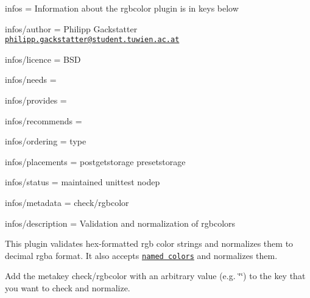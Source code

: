 
\begin{DoxyItemize}
\item infos = Information about the rgbcolor plugin is in keys below
\item infos/author = Philipp Gackstatter \href{mailto:philipp.gackstatter@student.tuwien.ac.at}{\tt philipp.\+gackstatter@student.\+tuwien.\+ac.\+at}
\item infos/licence = B\+SD
\item infos/needs =
\item infos/provides =
\item infos/recommends =
\item infos/ordering = type
\item infos/placements = postgetstorage presetstorage
\item infos/status = maintained unittest nodep
\item infos/metadata = check/rgbcolor
\item infos/description = Validation and normalization of rgbcolors
\end{DoxyItemize}

This plugin validates hex-\/formatted rgb color strings and normalizes them to decimal rgba format. It also accepts \href{https://www.w3.org/TR/css-color-3/#svg-color}{\tt named colors} and normalizes them.

Add the metakey {\ttfamily check/rgbcolor} with an arbitrary value (e.\+g. {\ttfamily \char`\"{}\char`\"{}}) to the key that you want to check and normalize.


